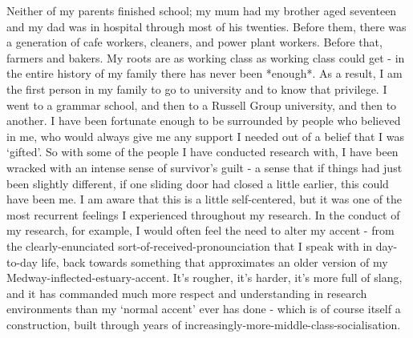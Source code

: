 Neither of my parents finished school; my mum had my brother aged seventeen and my dad was in hospital through most of his twenties. Before them, there was a generation of cafe workers, cleaners, and power plant workers. Before that, farmers and bakers.  My roots are as working class as working class could get - in the entire history of my family there has never been *enough*. As a result, I am the first person in my family to go to university and to know that privilege. I went to a grammar school, and then to a Russell Group university, and then to another. I have been fortunate enough to be surrounded by people who believed in me, who would always give me any support I needed out of a belief that I was ‘gifted’. So with some of the people I have conducted research with, I have been wracked with an intense sense of survivor’s guilt - a sense that if things had just been slightly different,  if one sliding door had closed a little earlier, this could have been me. I am aware that this is a little self-centered, but it was one of the most recurrent feelings I experienced throughout my research. In the conduct of my research, for example, I would often feel the need to alter my accent - from the clearly-enunciated sort-of-received-pronounciation that I speak with in day-to-day life, back towards something that approximates an older version of my Medway-inflected-estuary-accent. It’s rougher, it’s harder, it’s more full of slang, and it has commanded much more respect and understanding in research environments than my ‘normal accent’ ever has done - which is of course itself a construction, built through years of increasingly-more-middle-class-socialisation.

